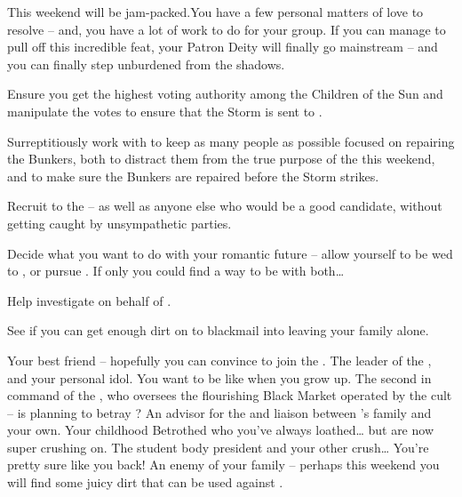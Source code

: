 \documentclass[char]{GL2020}
\begin{document}
This weekend will be jam-packed.You have a few personal matters of love to resolve -- and, you have a lot of work to do for your group. If you can manage to pull off this incredible feat, your Patron Deity will finally go mainstream -- and you can finally step unburdened from the shadows.
 
\begin{itemz}
	\item Ensure you get the highest voting authority among the Children of the Sun and manipulate the votes to ensure that the Storm is sent to \pSc{}.
	\item Surreptitiously work with \cChupSecond{} to keep as many people as possible focused on repairing the Bunkers, both to distract them from the true purpose of the \pGoaties{} this weekend, and to make sure the Bunkers are repaired before the Storm strikes.
	\item Recruit \cAmbition{} to the \pGoaties{} -- as well as anyone else who would be a good candidate, without getting caught by unsympathetic parties.
	\item Decide what you want to do with your romantic future -- allow yourself to be wed to \cHeir{}, or pursue \cPresident{}. If only you could find a way to be with both\ldots{}
	\item Help investigate \cChupSecond{} on behalf of \cChupLeader{}.
	\item See if you can get enough dirt on \cEvil{} to blackmail \cEvil{\them} into leaving your family alone.
\end{itemz}
 
\begin{itemz}[Notes]
	\item 
\end{itemz}
 
\begin{contacts}
	\contact{\cAmbition{}} Your best friend -- hopefully you can convince \cAmbition{\them} to join the \pGoaties{}.
	\contact{\cChupLeader{}} The leader of the \pGoaties{}, and your personal idol. You want to be like \cChupLeader{\them} when you grow up.
	\contact{\cChupSecond{}} The second in command of the \pGoaties{}, who oversees the flourishing Black Market operated by the cult -- is \cChupSecond{} planning to betray \cChupLeader{}?
	\contact{\cDiplomat{}} An advisor for the \pTech{} and liaison between \cHeir{}'s family and your own.
	\contact{\cHeir{}} Your childhood Betrothed who you've always loathed\ldots{} but are now super crushing on.
	\contact{\cPresident{}} The student body president and your other crush\ldots{} You're pretty sure  like you back!
	\contact{\cEvil{}} An enemy of your family -- perhaps this weekend you will find some juicy dirt that can be used against \cEvil{\them}.

\end{contacts}
 
\end{document}
